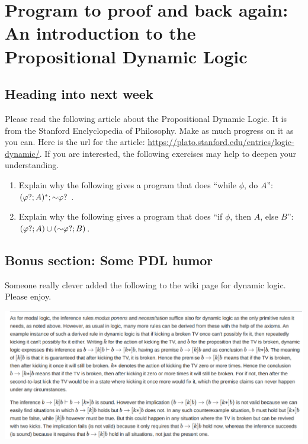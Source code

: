 \chapter[Week of Propositional Dynamic Logic]{Program to proof and back again: An introduction to the Propositional Dynamic Logic}

\setcounter{section}{-1}

\section{Heading into next week}

Please read the following article about the Propositional Dynamic Logic. It is from the Stanford Enclyclopedia of Philosophy.
Make as much progress on it as you can. Here is the url for the article: \url{https://plato.stanford.edu/entries/logic-dynamic/}.
If you are interested, the following exercises may help to deepen your understanding.

\begin{enumerate}
    \item Explain why the following gives a program that does ``while $\phi$, do $A$'':  $(\varphi ? ; A)^* ; \mathord{\sim} \varphi ?$ .
    \item Explain why the following gives a program that does ``if $\phi$, then $A$, else $B$'': $(\varphi ? ; A) \cup (\mathord{\sim} \varphi ? ; B)$.
\end{enumerate}

\section{Bonus section: Some PDL humor}

Someone really clever added the following to the wiki page for dynamic logic. Please enjoy.

\centering
\includegraphics[width=\textwidth]{image (1).png}